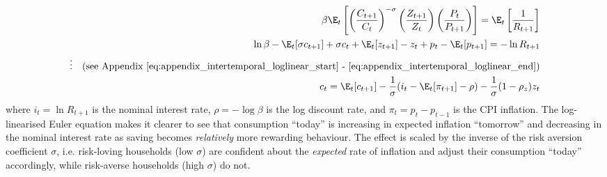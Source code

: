 \begin{align}
 \beta\E_t\left[\left(\frac{C_{t+1}}{C_{t}}\right)^{-\sigma} \left(\frac{Z_{t+1}}{Z_t}\right) \left(\frac{P_{t}}{ P_{t+1}}\right)\right] = \E_t \left[\frac{1}{R_{t+1}}\right] \nonumber\\
 \ln\beta - \E_t[\sigma c_{t+1}] + \sigma c_t + \E_t[z_{t+1}] - z_t + p_t - \E_t [p_{t+1}] = -\ln R_{t+1} \nonumber \\
 \vdots \quad \text{(see Appendix \ref{eq:appendix_intertemporal_loglinear_start} - \ref{eq:appendix_intertemporal_loglinear_end})}\nonumber\\
 c_t = \E_t[c_{t+1}] - \frac{1}{\sigma}( i_t - \E_t [\pi_{t+1}] - \rho ) - \frac{1}{\sigma}(1-\rho_z)z_t 
\end{align}
where $i_t = \ln R_{t+1}$ is the nominal interest rate, $\rho = -\log \beta$ is the log discount rate, and $\pi_t = p_t - p_{t-1}$ is the CPI inflation. The log-linearised Euler equation makes it clearer to see that consumption ``today'' is increasing in expected inflation ``tomorrow'' and decreasing in the nominal interest rate as saving becomes \textit{relatively} more rewarding behaviour. The effect is scaled by the inverse of the risk aversion coefficient $\sigma$, i.e. risk-loving households (low $\sigma$) are confident about the \textit{expected} rate of inflation and adjust their consumption ``today'' accordingly, while risk-averse households (high $\sigma$) do not.


